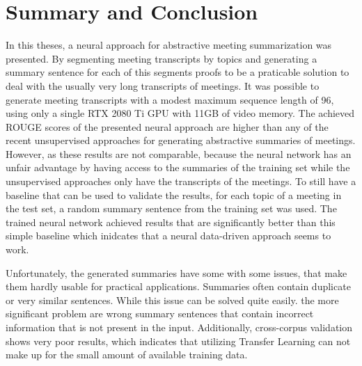 \chapter{Summary and Conclusion}\label{ch:summary-and-conclusion}

In this theses, a neural approach for abstractive meeting summarization was presented.
By segmenting meeting transcripts by topics and generating a summary sentence for each of this segments proofs to be a praticable solution to deal with the usually very long transcripts of meetings.
It was possible to generate meeting transcripts with a modest maximum sequence length of 96, using only a single RTX 2080 Ti GPU with 11GB of video memory.
The achieved ROUGE scores of the presented neural approach are higher than any of the recent unsupervised approaches for generating abstractive summaries of meetings.
However, as these results are not comparable, because the neural network has an unfair advantage by having access to the summaries of the training set while the unsupervised approaches only have the transcripts of the meetings.
To still have a baseline that can be used to validate the results, for each topic of a meeting in the test set, a random summary sentence from the training set was used.
The trained neural network achieved results that are significantly better than this simple baseline which inidcates that a neural data-driven approach seems to work.

Unfortunately, the generated summaries have some with some issues, that make them hardly usable for practical applications.
Summaries often contain duplicate or very similar sentences.
While this issue can be solved quite easily. the more significant problem are wrong summary sentences that contain incorrect information that is not present in the input.
Additionally, cross-corpus validation shows very poor results, which indicates that utilizing Transfer Learning can not make up for the small amount of available training data.